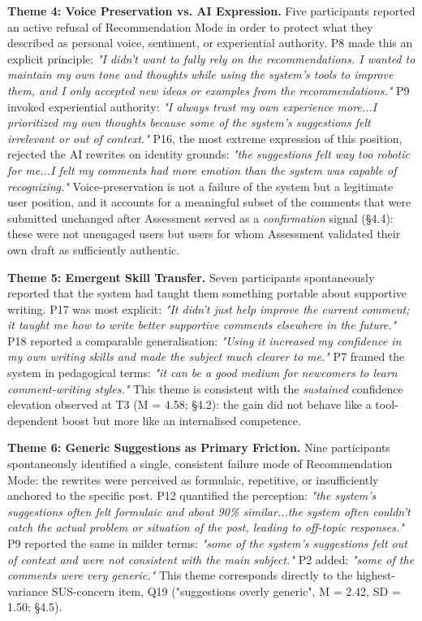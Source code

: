 \documentclass[]{llncs}
\begin{document}
\textbf{Theme 4: Voice Preservation vs. AI Expression.} 
Five participants reported an active refusal of Recommendation Mode in order to protect what they described as personal voice, sentiment, or experiential authority. P8 made this an explicit principle: \textit{"I didn't want to fully rely on the recommendations. I wanted to maintain my own tone and thoughts while using the system's tools to improve them, and I only accepted new ideas or examples from the recommendations."} P9 invoked experiential authority: \textit{"I always trust my own experience more...I prioritized my own thoughts because some of the system's suggestions felt irrelevant or out of context."} P16, the most extreme expression of this position, rejected the AI rewrites on identity grounds: \textit{"the suggestions felt way too robotic for me...I felt my comments had more emotion than the system was capable of recognizing."} Voice-preservation is not a failure of the system but a legitimate user position, and it accounts for a meaningful subset of the comments that were submitted unchanged after Assessment served as a \textit{confirmation} signal (§4.4): these were not unengaged users but users for whom Assessment validated their own draft as sufficiently authentic.

\textbf{Theme 5: Emergent Skill Transfer.} 
Seven participants spontaneously reported that the system had taught them something portable about supportive writing. P17 was most explicit: \textit{"It didn't just help improve the current comment; it taught me how to write better supportive comments elsewhere in the future."} P18 reported a comparable generalisation: \textit{"Using it increased my confidence in my own writing skills and made the subject much clearer to me."} P7 framed the system in pedagogical terms: \textit{"it can be a good medium for newcomers to learn comment-writing styles."} This theme is consistent with the \textit{sustained} confidence elevation observed at T3 (M = 4.58; §4.2): the gain did not behave like a tool-dependent boost but more like an internalised competence.

\textbf{Theme 6: Generic Suggestions as Primary Friction.} 
Nine participants spontaneously identified a single, consistent failure mode of Recommendation Mode: the rewrites were perceived as formulaic, repetitive, or insufficiently anchored to the specific post. P12 quantified the perception: \textit{"the system's suggestions often felt formulaic and about 90\% similar...the system often couldn't catch the actual problem or situation of the post, leading to off-topic responses."} P9 reported the same in milder terms: \textit{"some of the system's suggestions felt out of context and were not consistent with the main subject."} P2 added: \textit{"some of the comments were very generic."} This theme corresponds directly to the highest-variance SUS-concern item, Q19 ("suggestions overly generic", M = 2.42, SD = 1.50; §4.5).
\end{document}
